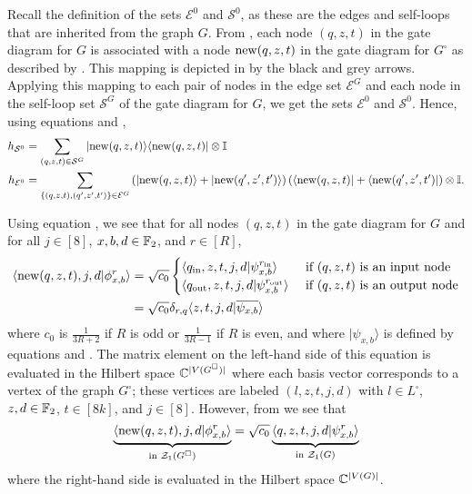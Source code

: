 \documentclass[../thesis-main/thesis-main]{subfiles}
\begin{document}
Recall the definition of the sets $\mathcal{E}^{0}$ and $\mathcal{S}^{0}$, as these are the edges and self-loops that are inherited from the graph $G$. From , each node $(q,z,t)$ in the gate diagram for $G$ is associated with a node $\operatorname{new}(q,z,t)$ in the gate diagram for $G^{\square}$ as described by . This mapping is depicted in  by the black and grey arrows. Applying this mapping to each pair of nodes in the edge set $\mathcal{E}^{G}$ and each node in the self-loop set $\mathcal{S}^{G}$ of the gate diagram for $G$, we get the sets $\mathcal{E}^{0}$ and $\mathcal{S}^{0}$. Hence, using equations  and ,
\begin{align}
h_{\mathcal{S}^0} &=\sum_{(q,z,t)\in \mathcal{S}^G} |{\operatorname{new}(q,z,t)}\rangle\langle{\operatorname{new}(q,z,t)}|\otimes \mathbb{I} \label{eq:hS0}\\
h_{\mathcal{E}^0} &=\sum_{\{(q,z,t),(q^\prime,z^\prime,t^\prime)\}\in \mathcal{E}^G} \left(|{\operatorname{new}(q,z,t)}\rangle+|{\operatorname{new}(q^\prime,z^\prime,t^\prime)}\rangle\right)\left(\langle{\operatorname{new}(q,z,t)}|+\langle{\operatorname{new}(q^\prime,z^\prime,t^\prime)}|\right)\otimes \mathbb{I}.\label{eq:hE0}
\end{align}

Using equation , we see that for all nodes $(q,z,t)$ in the gate diagram for $G$ and for all $j\in[8]$, $x,b,d\in\mathbb{F}_2$, and $r\in[R]$,
\begin{align}
  \langle{\operatorname{new}(q,z,t),j,d}|\phi^r_{x,b}\rangle & =\sqrt{c_0}
    \begin{cases}
      \langle q_{\mathrm{in}},z,t,j,d|\psi^{r_{\mathrm{in}}}_{x,b}\rangle & \text{ if $(q,z,t)$ is an input node}\\
      \langle q_{\mathrm{out}},z,t,j,d|\psi^{r_{\mathrm{out}}}_{x,b}\rangle & \text{ if $(q,z,t)$ is an output node}
    \end{cases}\nonumber \\
  &=\sqrt{c_0}\delta_{r,q} \langle z,t,j,d|\overline{\psi_{x,b}}\rangle
  \label{eq:mat_el_newnodes}
\end{align}
where $c_0$ is $\frac{1}{3R+2}$ if $R$ is odd or $\frac{1}{3R-1}$ if $R$ is even, and where $|\psi_{x,b}\rangle$ is defined by equations  and . The matrix element on the left-hand side of this equation is evaluated in the Hilbert space $\mathbb{C}^{|V(G^\square)|}$ where each basis vector corresponds to a vertex of the graph $G^\square$; these vertices are labeled $(l,z,t,j,d)$ with $l\in L^\square$, $z,d\in \mathbb{F}_2$, $t\in[8k]$, and $j\in[8]$. However, from  we see that
\begin{equation}
  \underbrace{\langle \operatorname{new}(q,z,t),j,d|\phi^r_{x,b}\rangle}_{\text{in } \mathcal{Z}_1 (G^\square)}=\sqrt{c_0}\underbrace{\langle q,z,t,j,d|\psi^r_{x,b}\rangle}_{\text{in } \mathcal{Z}_1 (G)} \label{eq:twoHspaces}
\end{equation}
where the right-hand side is evaluated in the Hilbert space $\mathbb{C}^{|V(G)|}$.
\end{document}
